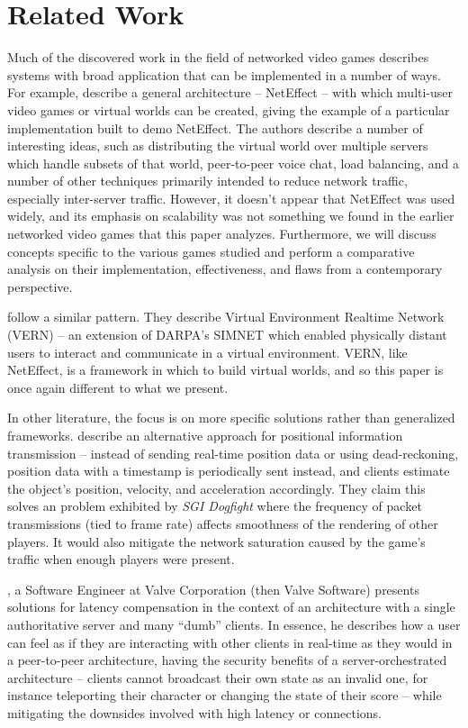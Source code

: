 \section{Related Work}
\label{sec:related}

Much of the discovered work in the field of networked video games describes systems with broad application that can be implemented in a number of ways. For example, \citet{Das1997NetEffect} describe a general architecture -- NetEffect -- with which multi-user video games or virtual worlds can be created, giving the example of a particular implementation built to demo NetEffect. The authors describe a number of interesting ideas, such as distributing the virtual world over multiple servers which handle subsets of that world, peer-to-peer voice chat, load balancing, and a number of other techniques primarily intended to reduce network traffic, especially inter-server traffic. However, it doesn't appear that NetEffect was used widely, and its emphasis on scalability was not something we found in the earlier networked video games that this paper analyzes. Furthermore, we will discuss concepts  specific to the various games studied and perform a comparative analysis on their implementation, effectiveness, and flaws from a contemporary perspective.

\citet{Blau1992NetworkedEnvironments} follow a similar pattern. They describe Virtual Environment Realtime Network (VERN) -- an extension of DARPA's SIMNET which enabled physically distant users to interact and communicate in a virtual environment. VERN, like NetEffect, is a framework in which to build virtual worlds, and so this paper is once again different to what we present.

In other literature, the focus is on more specific solutions rather than generalized frameworks. \citet{Singhal1995ExploitingReality}  describe an alternative approach for positional information transmission -- instead of sending real-time position data or using dead-reckoning, position data with a timestamp is periodically sent instead, and clients estimate the object's position, velocity, and acceleration accordingly. They claim this solves an problem exhibited by \textit{SGI Dogfight} where the frequency of packet transmissions (tied to frame rate) affects smoothness of the rendering of other players. It would also mitigate the network saturation caused by the game's traffic when enough players were present.

\citet{YahnW.Bernier2003LatencyOptimization}, a Software Engineer at Valve Corporation (then Valve Software) presents solutions for latency compensation in the context of an architecture with a single authoritative server and many ``dumb'' clients. In essence, he describes how a user can feel as if they are interacting with other clients in real-time as they would in a peer-to-peer architecture, having the security benefits of a server-orchestrated architecture -- clients cannot broadcast their own state as an invalid one, for instance teleporting their character or changing the state of their score -- while mitigating the downsides involved with high latency or connections.

